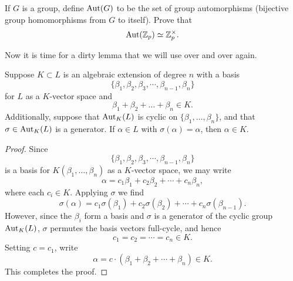 \documentclass{ximera}
\begin{document}
\begin{exercise}
  If $G$ is a group, define $\operatorname{Aut}(G)$ to be the set of group
  automorphisms (bijective group homomorphisms from $G$ to
  itself). Prove that
  \[
  \operatorname{Aut}(\mathbb Z_p) \simeq \mathbb Z_p^\times.
  \]
\end{exercise}



Now it is time for a dirty lemma that we will use over and over again.


\begin{lemma}\label{L:fgf}
  Suppose $K\subset L$ is an algebraic extension of degree $n$
  with a basis
  \[
  \{\beta_1,\beta_2,\beta_3,\cdots,\beta_{n-1},\beta_n\}
  \]
  for $L$ as a $K$-vector space and
  \[
  \beta_1 + \beta_2 + \dots + \beta_n \in K.
  \]
  Additionally, suppose that $\operatorname{Aut}_{K}(L)$ is cyclic on
  $\{\beta_1,\dots,\beta_n\}$, and that $\sigma\in\operatorname{Aut}_{K}(L)$ is a
  generator. If $\alpha\in L$ with $\sigma(\alpha) = \alpha$, then
  $\alpha\in K$.
  \begin{proof}
    Since
    \[
    \{\beta_1,\beta_2,\beta_3,\cdots,\beta_{n-1},\beta_n\}
    \]
    is a basis for $K(\beta_1,\dots,\beta_n)$ as a $K$-vector space, we may  write
    \[
    \alpha = c_1 \beta_1 + c_2 \beta_2 + \cdots + c_n\beta_{n},
    \]
    where each $c_i\in K$. Applying $\sigma$ we find
    \[
    \sigma(\alpha) = c_1 \sigma(\beta_1) + c_2 \sigma(\beta_2) + \cdots + c_n\sigma(\beta_{n-1}).
    \]
    However, since the $\beta_i$ form a basis and $\sigma$ is a
    generator of the cyclic group $\operatorname{Aut}_{K}(L)$, $\sigma$ permutes the
    basis vectors full-cycle, and hence
    \[
    c_1 = c_2 = \cdots = c_{n}\in K.
    \]
    Setting $c= c_1$, write
    \[
    \alpha = c \cdot (\beta_1 + \beta_2 + \cdots + \beta_{n}) \in K.
    \]
    This completes the proof.
  \end{proof}
\end{lemma}
\end{document}
